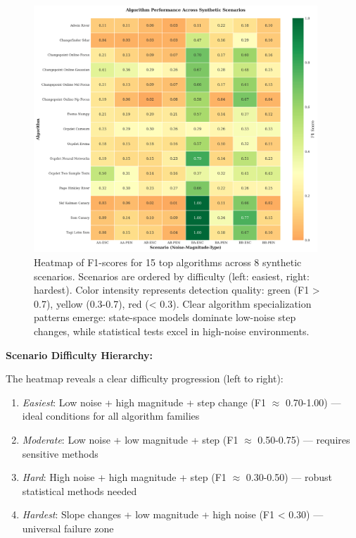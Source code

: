 \begin{figure}[H]
\centering
\includegraphics[width=0.95\textwidth]{figures/fig_scenario_heatmap.png}
\caption{Heatmap of F1-scores for 15 top algorithms across 8 synthetic scenarios. Scenarios are ordered by difficulty (left: easiest, right: hardest). Color intensity represents detection quality: green (F1 > 0.7), yellow (0.3-0.7), red (< 0.3). Clear algorithm specialization patterns emerge: state-space models dominate low-noise step changes, while statistical tests excel in high-noise environments.}
\label{fig:scenario_heatmap}
\end{figure}

\textbf{Scenario Difficulty Hierarchy:}

The heatmap reveals a clear difficulty progression (left to right):
\begin{enumerate}
    \item \textit{Easiest}: Low noise + high magnitude + step change (F1 $\approx$ 0.70-1.00) — ideal conditions for all algorithm families
    \item \textit{Moderate}: Low noise + low magnitude + step (F1 $\approx$ 0.50-0.75) — requires sensitive methods
    \item \textit{Hard}: High noise + high magnitude + step (F1 $\approx$ 0.30-0.50) — robust statistical methods needed
    \item \textit{Hardest}: Slope changes + low magnitude + high noise (F1 < 0.30) — universal failure zone
\end{enumerate}

